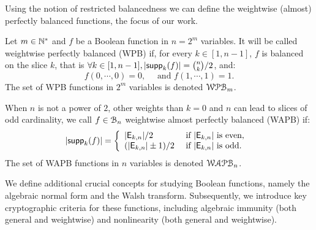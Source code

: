 \documentclass[11pt]{llncs}
\begin{document}

Using the notion of restricted balancedness we can define the weightwise (almost) perfectly balanced functions, the focus of our work.

\begin{definition}\label{def:WAPB}
	Let $m\in \mathbb{N}^*$ and $f$ be a Boolean function in $n=2^m$ variables. It will be called weightwise perfectly balanced (WPB) if, for every $k\in[1,n-1]$, $f$ is balanced on the slice $k$, that is $\forall k \in [1,n-1], |\mathsf{supp}_{k}(f)|=\binom{n}{k}/2$, and:
	\[f(0,\cdots,0)=0,\quad \text{ and } f(1,\cdots,1)=1.\]	
	The set of WPB functions in $2^m$ variables is denoted $\mathcal{WPB}_{m}$.
	
	When $n$ is not a power of $2$, other weights than $k=0$ and $n$ can lead to slices of odd cardinality, we call $f\in \mathcal{B}_{n}$ weightwise almost perfectly balanced (WAPB) if: 
	\[|\mathsf{supp}_{k}(f)|= \left \{
	\begin{array}{l l}
	|\mathsf{E}_{k,n}|/2  & \text{ if } |\mathsf{E}_{k,n}| \text{ is even, } \\
	(|\mathsf{E}_{k,n}|\pm 1)/2  & \text{ if }  |\mathsf{E}_{k,n}| \text{ is odd.}
	\end{array}\right.\]
	The set of WAPB functions in $n$ variables is denoted $\mathcal{WAPB}_{n}$.		
\end{definition}



We define additional crucial concepts for studying Boolean functions, namely the algebraic normal form and the Walsh transform. 
Subsequently, we introduce key cryptographic criteria for these functions, including algebraic immunity (both general and weightwise) and nonlinearity (both general and weightwise).
\end{document}
